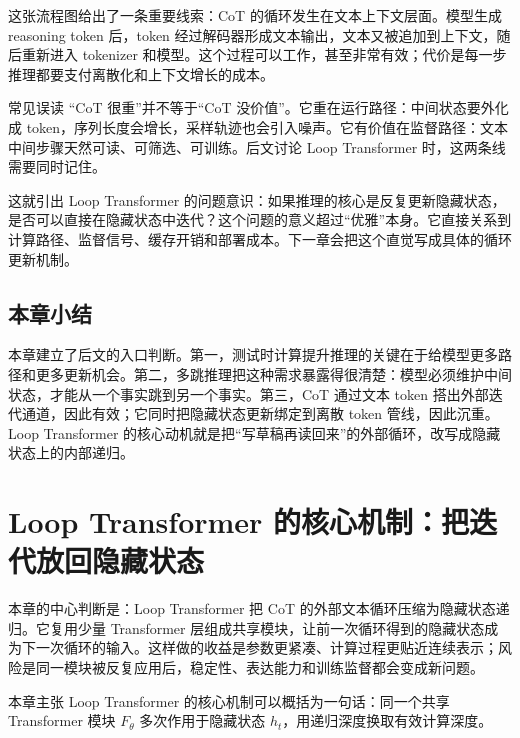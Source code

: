 ﻿\documentclass[a4paper]{article}
\begin{document}
这张流程图给出了一条重要线索：CoT 的循环发生在文本上下文层面。模型生成 reasoning token 后，token 经过解码器形成文本输出，文本又被追加到上下文，随后重新进入 tokenizer 和模型。这个过程可以工作，甚至非常有效；代价是每一步推理都要支付离散化和上下文增长的成本。

\begin{warningbox}{常见误读}
“CoT 很重”并不等于“CoT 没价值”。它重在运行路径：中间状态要外化成 token，序列长度会增长，采样轨迹也会引入噪声。它有价值在监督路径：文本中间步骤天然可读、可筛选、可训练。后文讨论 Loop Transformer 时，这两条线需要同时记住。
\end{warningbox}

这就引出 Loop Transformer 的问题意识：如果推理的核心是反复更新隐藏状态，是否可以直接在隐藏状态中迭代？这个问题的意义超过“优雅”本身。它直接关系到计算路径、监督信号、缓存开销和部署成本。下一章会把这个直觉写成具体的循环更新机制。

\subsection{本章小结}

本章建立了后文的入口判断。第一，测试时计算提升推理的关键在于给模型更多路径和更多更新机会。第二，多跳推理把这种需求暴露得很清楚：模型必须维护中间状态，才能从一个事实跳到另一个事实。第三，CoT 通过文本 token 搭出外部迭代通道，因此有效；它同时把隐藏状态更新绑定到离散 token 管线，因此沉重。Loop Transformer 的核心动机就是把“写草稿再读回来”的外部循环，改写成隐藏状态上的内部递归。


\section{Loop Transformer 的核心机制：把迭代放回隐藏状态}
\label{sec:loop-transformer-core}

本章的中心判断是：Loop Transformer 把 CoT 的外部文本循环压缩为隐藏状态递归。它复用少量 Transformer 层组成共享模块，让前一次循环得到的隐藏状态成为下一次循环的输入。这样做的收益是参数更紧凑、计算过程更贴近连续表示；风险是同一模块被反复应用后，稳定性、表达能力和训练监督都会变成新问题。

\begin{importantbox}{本章主张}
Loop Transformer 的核心机制可以概括为一句话：同一个共享 Transformer 模块 \(F_\theta\) 多次作用于隐藏状态 \(h_t\)，用递归深度换取有效计算深度。
\end{importantbox}
\end{document}
